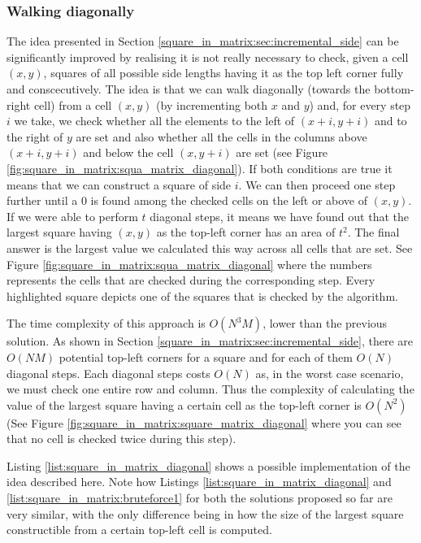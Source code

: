 \subsubsection{Walking diagonally}
The idea presented in Section \ref{square_in_matrix:sec:incremental_side} can be significantly
improved by realising it is not really necessary to check, given a cell $(x,y)$, squares of all
possible side lengths having it as the top left corner  fully and conscecutively. The idea is that
we can walk diagonally (towards the bottom-right cell) from a cell $(x,y)$ (by incrementing both $x$
and $y$) and, for every step $i$ we take, we check whether all the elements to the left of $(x+i,
y+i)$  and to the right of  $y$ are set and also whether all the cells in the columns above $(x+i,
y+i)$ and below the cell $(x,y+i)$ are set (see Figure
\ref{fig:square_in_matrix:squa_matrix_diagonal}). If both conditions are true it means that we can
construct a square of side $i$. We can then proceed one step further until a $0$ is found among the
checked cells on the left or above of $(x,y)$. If we were able to perform $t$ diagonal steps, it
means we have found out that the largest square having $(x,y)$ as the top-left corner has an area of
$t^2$. The final answer is the largest value we calculated this way across all cells that are set.
See Figure \ref{fig:square_in_matrix:squa_matrix_diagonal} where the numbers represents the cells
that are checked during the corresponding step. Every highlighted square depicts one of the squares
that is checked by the algorithm.


The time complexity of this approach is $O(N^3M)$, lower than the previous solution. As shown in
Section \ref{square_in_matrix:sec:incremental_side}, there are $O(NM)$ potential top-left corners for
a square and for each of them $O(N)$ diagonal steps. Each diagonal steps costs $O(N)$ as, in the
worst case scenario,  we must check one entire row and column. Thus the complexity of calculating the value of
the largest square having a certain cell  as  the top-left corner is $O(N^2)$ (See Figure
\ref{fig:square_in_matrix:square_matrix_diagonal} where you can see that no cell is checked twice
during this step). 

Listing \ref{list:square_in_matrix_diagonal} shows a possible implementation of the idea described
here. Note how Listings \ref{list:square_in_matrix_diagonal} and
\ref{list:square_in_matrix:bruteforce1} for both the solutions proposed so far are very similar,
with the only difference being in how the size of the largest square constructible from a certain
top-left cell is computed.


